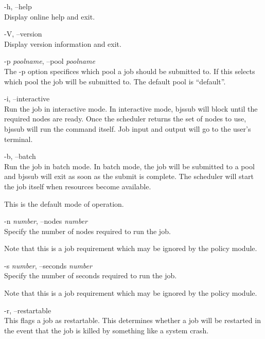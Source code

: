 \documentclass[oneside]{book}
\begin{document}
\begin{description}

\item{-h, --help}\\
  Display online help and exit.

\item{-V, --version}\\
  Display version information and exit.

\item{-p \textit{poolname}, --pool \textit{poolname}}\\
  The -p option specifices which pool a job should be submitted to.
  If this selects which pool the job will be submitted to.  The
  default pool is ``default''.

\item{-i, --interactive}\\
  Run the job in interactive mode.  In interactive mode, bjssub will
  block until the required nodes are ready.  Once the scheduler
  returns the set of nodes to use, bjssub will run the command itself.
  Job input and output will go to the user's terminal.

\item{-b, --batch}\\
  Run the job in batch mode.  In batch mode, the job will be submitted
  to a pool and bjssub will exit as soon as the submit is complete.
  The scheduler will start the job itself when resources become
  available.

  This is the default mode of operation.

\item{-n \textit{number}, --nodes \textit{number}}\\
  Specify the number of nodes required to run the job.

  Note that this is a job requirement which may be ignored by the
  policy module.

\item{-s \textit{number}, --seconds \textit{number}}\\
  Specify the number of seconds required to run the job.

  Note that this is a job requirement which may be ignored by the
  policy module.

\item{-r, --restartable}\\
  This flags a job as restartable.  This determines whether a job will
  be restarted in the event that the job is killed by something like a
  system crash.


\end{description}
\end{document}
